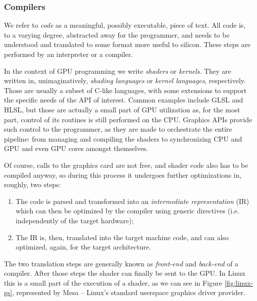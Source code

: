\documentclass[conference, onecolumn]{IEEEtran}
\begin{document}
\subsubsection{Compilers} \label{sec:proposal:compilers}

We refer to \textit{code} as a meaningful, possibly executable, piece of text.
All code is, to a varying degree, abstracted away for the programmer, and needs
to be understood and translated to some format more useful to silicon.
These steps are performed by an interpreter or a compiler.

In the context of GPU programming we write \textit{shaders} or \textit{kernels}.
They are written in, unimaginatively, \textit{shading languages} or
\textit{kernel languages}, respectively.
Those are usually a subset of C-like languages, with some extensions to support
the specific needs of the API of interest.
Common examples include GLSL and HLSL, but those are actually a small part of
GPU utilization as, for the most part, control of its routines is still
performed on the CPU.
Graphics APIs provide such control to the programmer, as they are made to
orchestrate the entire pipeline: from managing and compiling the shaders to
synchronizing CPU and GPU and even GPU cores amongst themselves.

Of course, calls to the graphics card are not free, and shader code also has to
be compiled anyway, so during this process it undergoes further optimizations
in, roughly, two steps:
\begin{enumerate}
    \item The code is parsed and transformed into an \textit{intermediate
        representation} (IR) which can then be optimized by the compiler using
        generic directives (i.e. independently of the target hardware);
    \item The IR is, then, translated into the target machine code, and can
        also optimized, again, for the target architecture.
\end{enumerate}
The two translation steps are generally known as \textit{front-end} and
\textit{back-end} of a compiler. After those steps the shader can finally be
sent to the GPU.
In Linux this is a small part of the execution of a shader, as we can see in
Figure \cref{fig:linux-gs}, represented by Mesa -- Linux's standard userspace
graphics driver provider.
\end{document}
